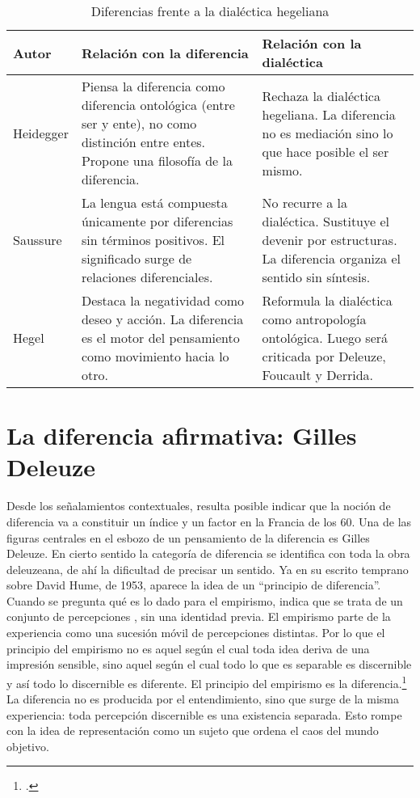 \begin{table}[!ht]
	\sf\footnotesize\setlength\tabcolsep{4pt}
	\centering
	\begin{tabular}{l | >{\raggedright\arraybackslash}m{3.8cm} | >{\raggedright\arraybackslash}m{4cm}}
		\toprule
		\textbf{Autor} & \textbf{Relación con la diferencia} & \textbf{Relación con la dialéctica} \\
		\midrule
		Heidegger &
		Piensa la diferencia como diferencia ontológica (entre ser y ente), no como distinción entre entes. Propone una filosofía de la diferencia. &
		Rechaza la dialéctica hegeliana. La diferencia no es mediación sino lo que hace posible el ser mismo. \\
		\midrule
		Saussure &
		La lengua está compuesta únicamente por diferencias sin términos positivos. El significado surge de relaciones diferenciales. &
		No recurre a la dialéctica. Sustituye el devenir por estructuras. La diferencia organiza el sentido sin síntesis. \\
		\midrule
		Hegel &
		Destaca la negatividad como deseo y acción. La diferencia es el motor del pensamiento como movimiento hacia lo otro. &
		Reformula la dialéctica como antropología ontológica. Luego será criticada por Deleuze, Foucault y Derrida. \\
		\bottomrule
	\end{tabular}
	\caption{Diferencias frente a la dialéctica hegeliana}
	\label{tab:Cuadro 1.1}
\end{table}

\section{La diferencia afirmativa: Gilles Deleuze}

Desde los señalamientos contextuales, resulta posible indicar que la noción de diferencia va a constituir un índice y un factor en la Francia de los 60. Una de las figuras centrales en el esbozo de un pensamiento de la diferencia es Gilles Deleuze. En cierto sentido la categoría de diferencia se identifica con toda la obra deleuzeana, de ahí la dificultad de precisar un sentido. Ya en su escrito temprano sobre David Hume, de 1953, aparece la idea de un \enquote{principio de diferencia}. Cuando se pregunta qué es lo dado para el empirismo, indica que se trata de un conjunto de percepciones , sin una identidad previa. El empirismo parte de la experiencia como una sucesión móvil de percepciones distintas. Por lo que el principio del empirismo no es aquel según el cual toda idea deriva de una impresión sensible, sino aquel según el cual todo lo que es separable es discernible y así todo lo discernible es diferente. El principio del empirismo es la diferencia.\footcite{@6970-DELEUZE1996} La diferencia no es producida por el entendimiento, sino que surge de la misma experiencia: toda percepción discernible es una existencia separada. Esto rompe con la idea de representación como un sujeto que ordena el caos del mundo objetivo.

